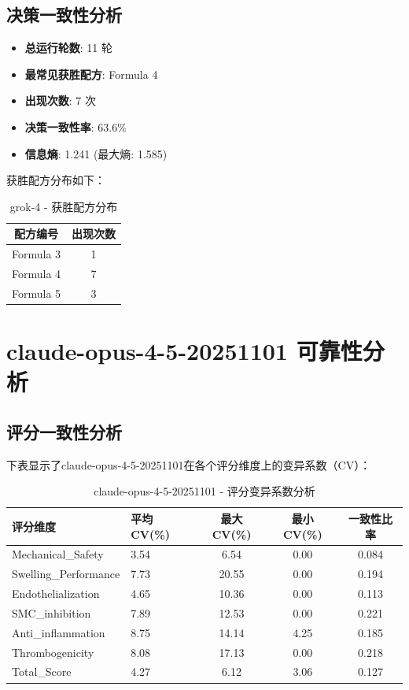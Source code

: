\documentclass[12pt,a4paper]{article}
\begin{document}
\subsection{决策一致性分析}


\begin{itemize}
    \item \textbf{总运行轮数}: 11 轮
    \item \textbf{最常见获胜配方}: Formula 4
    \item \textbf{出现次数}: 7 次
    \item \textbf{决策一致性率}: 63.6\%
    \item \textbf{信息熵}: 1.241 (最大熵: 1.585)
\end{itemize}

获胜配方分布如下：

\begin{table}[H]
\centering
\caption{grok-4 - 获胜配方分布}
\begin{tabular}{cc}
\toprule
\textbf{配方编号} & \textbf{出现次数} \\
\midrule
Formula 3 & 1 \\
Formula 4 & 7 \\
Formula 5 & 3 \\
\bottomrule
\end{tabular}
\end{table}


\newpage


\section{claude-opus-4-5-20251101 可靠性分析}

\subsection{评分一致性分析}

下表显示了claude-opus-4-5-20251101在各个评分维度上的变异系数（CV）：

\begin{table}[H]
\centering
\caption{claude-opus-4-5-20251101 - 评分变异系数分析}
\begin{tabular}{llccc}
\toprule
\textbf{评分维度} & \textbf{平均CV(\%)} & \textbf{最大CV(\%)} & \textbf{最小CV(\%)} & \textbf{一致性比率} \\
\midrule
Mechanical\_Safety & 3.54 & 6.54 & 0.00 & 0.084 \\
Swelling\_Performance & 7.73 & 20.55 & 0.00 & 0.194 \\
Endothelialization & 4.65 & 10.36 & 0.00 & 0.113 \\
SMC\_inhibition & 7.89 & 12.53 & 0.00 & 0.221 \\
Anti\_inflammation & 8.75 & 14.14 & 4.25 & 0.185 \\
Thrombogenicity & 8.08 & 17.13 & 0.00 & 0.218 \\
Total\_Score & 4.27 & 6.12 & 3.06 & 0.127 \\
\bottomrule
\end{tabular}
\end{table}
\end{document}
